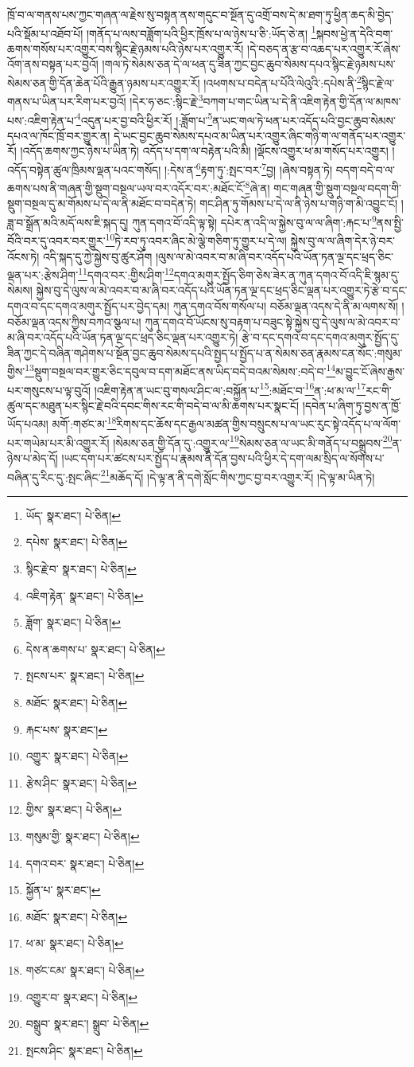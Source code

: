 ཁྲོ་བ་ལ་གནས་པས་ཀྱང་གཞན་ལ་རྗེས་སུ་བསྟན་ནས་གདུང་བ་སྔོན་དུ་འགྲོ་བས་དེ་མ་ཐག་ཏུ་ཕྱིན་ཆད་མི་བྱེད་པའི་སྡོམ་པ་འཐོབ་པོ། །གནོད་པ་ལས་བཟློག་པའི་ཕྱིར་ཁྲོས་པ་ལ་ཉེས་པ་ཅི་:ཡོད་ཅེ་ན། \footnote{ཡོད་  སྣར་ཐང་།  པེ་ཅིན། }སྐབས་ཕྱེ་ན་དེའི་བག་ཆགས་གསོས་པར་འགྱུར་བས་སྙིང་རྗེ་ཉམས་པའི་ཉེས་པར་འགྱུར་རོ། །དེ་བཅད་ན་རྩ་བ་འཆད་པར་འགྱུར་རོ་ཞེས་འོག་ནས་བསྟན་པར་བྱའོ། །གལ་ཏེ་སེམས་ཅན་དེ་ལ་ཕན་དུ་ཟིན་ཀྱང་བྱང་ཆུབ་སེམས་དཔའ་སྙིང་རྗེ་ཉམས་པས་སེམས་ཅན་གྱི་དོན་ཆེན་པོའི་རྒྱུན་ཉམས་པར་འགྱུར་རོ། །འཕགས་པ་བདེན་པ་པོའི་ལེའུའི་:དཔེས་ནི་\footnote{དཔེས་  སྣར་ཐང་།  པེ་ཅིན། }སྙིང་རྗེ་ལ་གནས་པ་ཡིན་པར་རིག་པར་བྱའོ། །དེར་ཧ་ཅང་:སྙིང་རྗེ་\footnote{སྙིང་རྗེ་བ་  སྣར་ཐང་།  པེ་ཅིན། }བཀག་པ་གང་ཡིན་པ་དེ་ནི་འཇིག་རྟེན་གྱི་དོན་ལ་མཁས་པས་:འཇིག་རྟེན་པ་\footnote{འཇིག་རྟེན་  སྣར་ཐང་།  པེ་ཅིན། }འདུན་པར་བྱ་བའི་ཕྱིར་རོ། །:ཟློག་པ་\footnote{ཟློག་  སྣར་ཐང་།  པེ་ཅིན། }ན་ཡང་གལ་ཏེ་ཕན་པར་འདོད་པའི་བྱང་ཆུབ་སེམས་དཔའ་ལ་ཁོང་ཁྲོ་བར་གྱུར་ན། དེ་ཡང་བྱང་ཆུབ་སེམས་དཔའ་མ་ཡིན་པར་འགྱུར་ཞིང་གཉི་ག་ལ་གནོད་པར་འགྱུར་རོ། །འདོད་ཆགས་ཀྱང་ཉེས་པ་ཡིན་ཏེ། འདོད་པ་དག་ལ་བརྟེན་པའི་མི། །ལྡོངས་འགྱུར་ཕ་མ་གསོད་པར་འགྱུར། །འདོད་བསྟེན་ཚུལ་ཁྲིམས་ལྡན་པའང་གསོད། །:དེས་ན་\footnote{དེས་ན་ཆགས་པ་  སྣར་ཐང་།  པེ་ཅིན། }རྟག་ཏུ་:སྤང་བར་\footnote{སྤངས་པར་  སྣར་ཐང་།  པེ་ཅིན། }བྱ། །ཞེས་བསྟན་ཏེ། བདག་བདེ་བ་ལ་ཆགས་པས་ནི་གཞན་གྱི་སྡུག་བསྔལ་ཡལ་བར་འདོར་བར་:མཐོང་ངོ་\footnote{མཐོང་  སྣར་ཐང་།  པེ་ཅིན། }ཞེ་ན། གང་གཞན་གྱི་སྡུག་བསྔལ་བདག་གི་སྡུག་བསྔལ་དུ་མ་གོམས་པ་དེ་ལ་ནི་མཐོང་བ་བདེན་ཏེ། གང་ཤིན་ཏུ་གོམས་པ་དེ་ལ་ནི་ཉེས་པ་གཉི་ག་མི་འབྱུང་ངོ། །ཟླ་བ་སྒྲོན་མའི་མདོ་ལས་ཇི་སྐད་དུ། ཀུན་དགའ་བོ་འདི་ལྟ་སྟེ། དཔེར་ན་འདི་ལ་སྐྱེས་བུ་ལ་ལ་ཞིག་:རྐང་པ་\footnote{རྐང་པས་  སྣར་ཐང་། }ནས་སྤྱི་བོའི་བར་དུ་འབར་བར་གྱུར་\footnote{འགྱུར་  སྣར་ཐང་།  པེ་ཅིན། }ཏེ་རབ་ཏུ་འབར་ཞིང་མེ་ལྕེ་གཅིག་ཏུ་གྱུར་པ་དེ་ལ། སྐྱེས་བུ་ལ་ལ་ཞིག་དེར་ཉེ་བར་འོངས་ཏེ། འདི་སྐད་དུ་ཀྱེ་སྐྱེས་བུ་ཚུར་ཤོག །ལུས་ལ་མེ་འབར་བ་མ་ཞི་བར་འདོད་པའི་ཡོན་ཏན་ལྔ་དང་ཕྲད་ཅིང་ལྡན་པར་:རྩེས་ཤིག་\footnote{རྩེས་ཤིང་  སྣར་ཐང་།  པེ་ཅིན། }དགའ་བར་:གྱིས་ཤིག་\footnote{གྱིས་  སྣར་ཐང་།  པེ་ཅིན། }དགའ་མགུར་སྤྱོད་ཅིག་ཅེས་ཟེར་ན་ཀུན་དགའ་བོ་འདི་ཇི་སྙམ་དུ་སེམས། སྐྱེས་བུ་དེ་ལུས་ལ་མེ་འབར་བ་མ་ཞི་བར་འདོད་པའི་ཡོན་ཏན་ལྔ་དང་ཕྲད་ཅིང་ལྡན་པར་འགྱུར་ཏེ་རྩེ་བ་དང་དགའ་བ་དང་དགའ་མགུར་སྤྱོད་པར་བྱེད་དམ། ཀུན་དགའ་བོས་གསོལ་པ། བཅོམ་ལྡན་འདས་དེ་ནི་མ་ལགས་སོ། །བཅོམ་ལྡན་འདས་ཀྱིས་བཀའ་སྩལ་པ། ཀུན་དགའ་བོ་ཡོངས་སུ་བརྟག་པ་བཟུང་སྟེ་སྐྱེས་བུ་དེ་ལུས་ལ་མེ་འབར་བ་མ་ཞི་བར་འདོད་པའི་ཡོན་ཏན་ལྔ་དང་ཕྲད་ཅིང་ལྡན་པར་འགྱུར་ཏེ། རྩེ་བ་དང་དགའ་བ་དང་དགའ་མགུར་སྤྱོད་དུ་ཟིན་ཀྱང་དེ་བཞིན་གཤེགས་པ་སྔོན་བྱང་ཆུབ་སེམས་དཔའི་སྤྱད་པ་སྤྱོད་པ་ན་སེམས་ཅན་རྣམས་ངན་སོང་:གསུམ་གྱིས་\footnote{གསུམ་གྱི་  སྣར་ཐང་།  པེ་ཅིན། }སྡུག་བསྔལ་བར་གྱུར་ཅིང་དབུལ་བ་དག་མཐོང་ནས་ཡིད་བདེ་བའམ་སེམས་:བདེ་བ་\footnote{དགའ་བར་  སྣར་ཐང་།  པེ་ཅིན། }མ་བྱུང་ངོ་ཞེས་རྒྱས་པར་གསུངས་པ་ལྟ་བུའོ། །འཇིག་རྟེན་ན་ཡང་བུ་གསལ་ཤིང་ལ་:བསྐྱོན་པ་\footnote{སྐྱོན་པ་  སྣར་ཐང་། }:མཐོང་བ་\footnote{མཐོང་  སྣར་ཐང་།  པེ་ཅིན། }ན་:ཕ་མ་ལ་\footnote{ཕ་མ་  སྣར་ཐང་།  པེ་ཅིན། }རང་གི་ཚུལ་དང་མཐུན་པར་སྙིང་རྗེ་བའི་དབང་གིས་རང་གི་བདེ་བ་ལ་མི་ཆགས་པར་སྣང་ངོ། །དབེན་པ་ཞིག་ཏུ་བྱས་ན་ཁྱོ་ཡོད་པའམ། མགོ་:གཙང་མ་\footnote{གཙང་ངམ་  སྣར་ཐང་།  པེ་ཅིན། }རིགས་དང་ཆོས་དང་རྒྱལ་མཚན་གྱིས་བསྲུངས་པ་ལ་ཡང་རུང་སྟེ་འདོད་པ་ལ་ལོག་པར་གཡེམ་པར་མི་འགྱུར་རོ། །སེམས་ཅན་གྱི་དོན་དུ་:འགྱུར་ལ་\footnote{འགྱུར་བ་  སྣར་ཐང་།  པེ་ཅིན། }སེམས་ཅན་ལ་ཡང་མི་གནོད་པ་བསྒྲུབས་\footnote{བསྒྲུབ་  སྣར་ཐང་། སྒྲུབ་  པེ་ཅིན། }ན་ཉེས་པ་མེད་དོ། །ཡང་དག་པར་ཚངས་པར་སྤྱོད་པ་རྣམས་ནི་དོན་བྱས་པའི་ཕྱིར་དེ་དག་ལམ་སྲིད་ལ་སོགས་པ་བཞིན་དུ་རིང་དུ་:སྤང་ཞིང་\footnote{སྤངས་ཤིང་  སྣར་ཐང་།  པེ་ཅིན། }མཆོད་དོ། །དེ་ལྟ་ན་ནི་དགེ་སློང་གིས་ཀྱང་བྱ་བར་འགྱུར་རོ། །དེ་ལྟ་མ་ཡིན་ཏེ། 